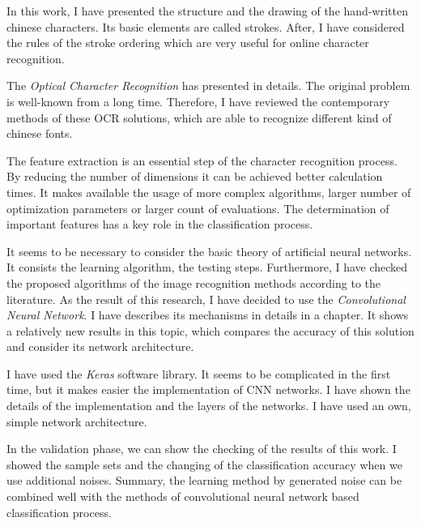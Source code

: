 In this work, I have presented the structure and the drawing of the hand-written chinese characters. Its basic elements are called strokes. After, I have considered the rules of the stroke ordering which are very useful for online character recognition.

The \textit{Optical Character Recognition} has presented in details. The original problem is well-known from a long time. Therefore, I have reviewed the contemporary methods of these OCR solutions, which are able to recognize different kind of chinese fonts.

The feature extraction is an essential step of the character recognition process. By reducing the number of dimensions it can be achieved better calculation times. It makes available the usage of more complex algorithms, larger number of optimization parameters or larger count of evaluations. The determination of important features has a key role in the classification process.

It seems to be necessary to consider the basic theory of artificial neural networks. It consists the learning algorithm, the testing steps. Furthermore, I have checked the proposed algorithms of the image recognition methods according to the literature. As the result of this research, I have decided to use the \textit{Convolutional Neural Network}. I have describes its mechanisms in details in a chapter. It shows a relatively new results in this topic, which compares the accuracy of this solution and consider its network architecture.

I have used the \textit{Keras} software library. It seems to be complicated in the first time, but it makes easier the implementation of CNN networks. I have shown the details of the implementation and the layers of the networks. I have used an own, simple network architecture.

In the validation phase, we can show the checking of the results of this work. I showed the sample sets and the changing of the classification accuracy when we use additional noises. Summary, the learning method by generated noise can be combined well with the methods of convolutional neural network based classification process.
 